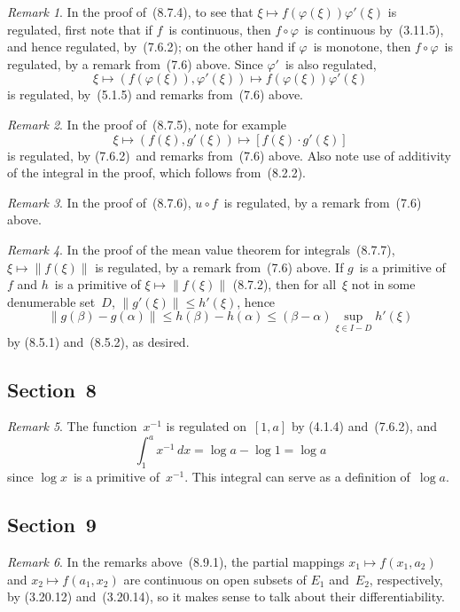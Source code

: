 \documentclass[letterpaper,12pt]{article}
\newcommand{\after}{\circ}
\newcommand{\inv}[1]{#1^{-1}}
\newcommand{\norm}[1]{\lVert{#1}\rVert}
\newcommand{\cbprod}[2]{[{#1}\cdot{#2}]}
\renewcommand{\d}[1]{\,d\!{#1}}
\newcommand{\dx}{\d{x}}
\theoremstyle{plain}
\theoremstyle{definition}
\theoremstyle{remark}
\newtheorem*{rmk}{Remark}
\begin{document}
\begin{rmk}
In the proof of~(8.7.4), to see that \(\xi\mapsto f(\varphi(\xi))\varphi'(\xi)\) is regulated, first note that if \(f\)~is continuous, then \(f\after\varphi\)~is continuous by~(3.11.5), and hence regulated, by~(7.6.2); on the other hand if \(\varphi\)~is monotone, then \(f\after\varphi\)~is regulated, by a remark from~(7.6) above. Since \(\varphi'\)~is also regulated,
\[\xi\mapsto(f(\varphi(\xi)),\varphi'(\xi))\mapsto f(\varphi(\xi))\varphi'(\xi)\]
is regulated, by~(5.1.5) and remarks from~(7.6) above.
\end{rmk}

\begin{rmk}
In the proof of~(8.7.5), note for example
\[\xi\mapsto(f(\xi),g'(\xi))\mapsto\cbprod{f(\xi)}{g'(\xi)}\]
is regulated, by (7.6.2)~and remarks from~(7.6) above. Also note use of additivity of the integral in the proof, which follows from~(8.2.2).
\end{rmk}

\begin{rmk}
In the proof of~(8.7.6), \(u\after f\)~is regulated, by a remark from~(7.6) above.
\end{rmk}

\begin{rmk}
In the proof of the mean value theorem for integrals~(8.7.7), \(\xi\mapsto\norm{f(\xi)}\) is regulated, by a remark from~(7.6) above. If \(g\)~is a primitive of~\(f\) and \(h\)~is a primitive of \(\xi\mapsto\norm{f(\xi)}\) (8.7.2), then for all~\(\xi\) not in some denumerable set~\(D\), \(\norm{g'(\xi)}\le h'(\xi)\), hence
\[\norm{g(\beta)-g(\alpha)}\le h(\beta)-h(\alpha)\le(\beta-\alpha)\sup_{\xi\in I-D} h'(\xi)\]
by (8.5.1) and~(8.5.2), as desired.
\end{rmk}

\subsection*{Section~8}
\begin{rmk}
The function~\(\inv{x}\) is regulated on~\([1,a]\) by (4.1.4) and~(7.6.2), and
\[\int_1^a\inv{x}\dx=\log a-\log 1=\log a\]
since \(\log x\)~is a primitive of~\(\inv{x}\). This integral can serve as a definition of~\(\log a\).
\end{rmk}

\subsection*{Section~9}
\begin{rmk}
In the remarks above~(8.9.1), the partial mappings \(x_1\mapsto f(x_1,a_2)\) and \(x_2\mapsto f(a_1,x_2)\) are continuous on open subsets of \(E_1\) and~\(E_2\), respectively, by (3.20.12) and~(3.20.14), so it makes sense to talk about their differentiability.
\end{rmk}
\end{document}
